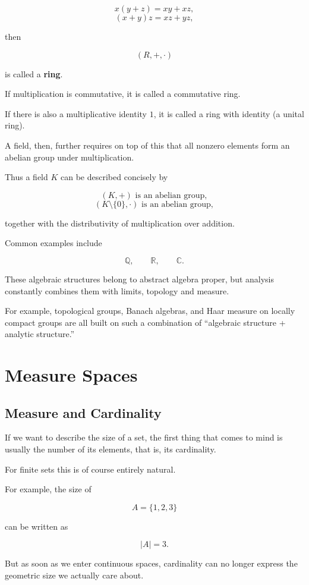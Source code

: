 \documentclass[11pt]{article}
\begin{document}
\[
x(y+z)=xy+xz,
\]
\[
(x+y)z=xz+yz,
\]

then

\[
(R,+,\cdot)
\]

is called a \textbf{ring}.

If multiplication is commutative, it is called a commutative ring.

If there is also a multiplicative identity $1$, it is called a ring with identity (a unital ring).

A field, then, further requires on top of this that all nonzero elements form an abelian group under multiplication.

Thus a field $K$ can be described concisely by

\[
(K,+)\text{ is an abelian group},
\]
\[
(K\setminus\{0\},\cdot)\text{ is an abelian group},
\]

together with the distributivity of multiplication over addition.

Common examples include

\[
\mathbb{Q},\qquad\mathbb{R},\qquad\mathbb{C}.
\]

These algebraic structures belong to abstract algebra proper, but analysis constantly combines them with limits, topology and measure.

For example, topological groups, Banach algebras, and Haar measure on locally compact groups are all built on such a combination of ``algebraic structure + analytic structure.''

\section{Measure Spaces}

\subsection{Measure and Cardinality}

If we want to describe the size of a set, the first thing that comes to mind is usually the number of its elements, that is, its cardinality.

For finite sets this is of course entirely natural.

For example, the size of

\[
A=\{1,2,3\}
\]

can be written as

\[
|A|=3.
\]

But as soon as we enter continuous spaces, cardinality can no longer express the geometric size we actually care about.
\end{document}
